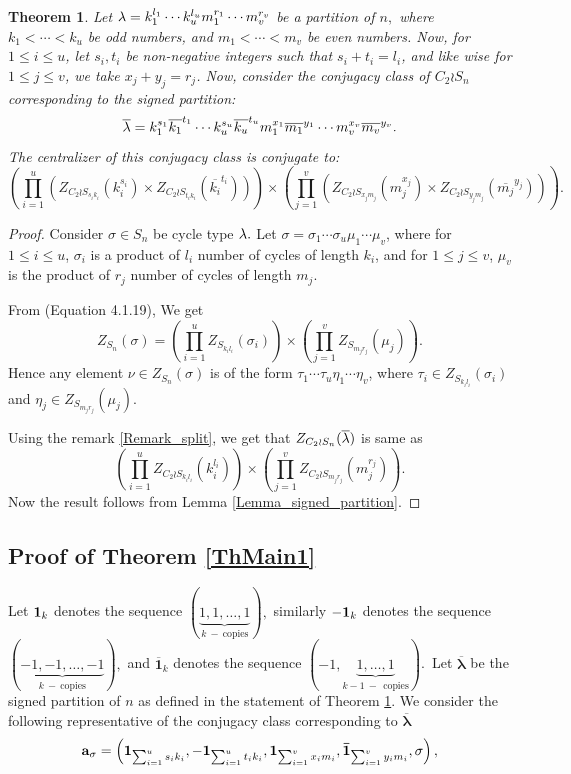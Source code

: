 \documentclass[12pt,twoside,reqno]{amsart}
\newtheorem{theorem}{Theorem}[section]
\theoremstyle{definition}
\numberwithin{equation}{section}
\newcommand{\bmf}[1]{\mathbf{#1}}
\newcommand{\Lbd}{\bm {\lambda}}
\begin{document}
\begin{theorem}\label{ThOddEven}
Let ${\bf \lambda} =k_1^{l_1}\cdots k_u^{l_u}m_1^{r_1}\cdots m_v^{r_v}$ be a partition of $n,$ where $k_1< \cdots < k_u$ be odd numbers, and $m_1<\cdots <m_v$ be even numbers. Now, for $1\leq i \leq u$, let $s_i, t_i$ be non-negative integers such that $s_i + t_i = l_i$, and like wise for $1\leq j \leq v$, we take $x_j+y_j = r_j$. Now, consider the conjugacy class of $C_2 \wr S_n$ corresponding to the signed partition: 
$${\bf \overline{\lambda}}=k_1^{s_1}\overline{k_1}^{t_1}\cdots k_u^{s_u}\overline{k_u}^{t_u}m_1^{x_1}\overline{m_1}^{y_1}\cdots m_v^{x_v}\overline{m_v}^{y_v}.$$
The centralizer of this conjugacy class is conjugate to:
$$\left(\prod_{i=1}^u (Z_{C_2 \wr {S_{s_ik_i}}}(k_i^{s_i})\times Z_{C_2 \wr{S_{t_ik_i}}}(\overline{k_i}^{t_i})) \right)\times \left(\prod_{j=1}^v (Z_{C_2 \wr{S_{x_jm_j}}}(m_j^{x_j})\times Z_{C_2 \wr {S_{y_jm_j}}}(\overline{m_j}^{y_j})) \right).$$
\end{theorem}
\begin{proof}
    Consider $\sigma\in S_n$  be cycle type ${\bf \lambda}.$ Let $\sigma = \sigma_1\cdots \sigma_u\mu_1\cdots\mu_v$, where for $1\leq i \leq u$, $\sigma_i$ is a product of $l_i$ number of cycles of length $k_i$, and for $1\leq j \leq v$, $\mu_v$ is the product of $r_j$ number of cycles of length $m_j.$ 

From \cite{JK}(Equation 4.1.19), We get 
$$Z_{S_n}(\sigma)= \left(\prod_{i=1}^u Z_{S_{k_il_i}}(\sigma_i)\right)\times \left(\prod_{j=1}^vZ_{S_{m_jr_j}}(\mu_j)\right).$$ Hence any element $\nu \in Z_{S_n}(\sigma)$ is of the form $\tau_1\cdots\tau_u\eta_1\cdots\eta_v$, where $\tau_i\in Z_{S_{k_il_i}}(\sigma_i)$ and $\eta_j \in Z_{S_{m_jr_j}}(\mu_j)$. 

Using the remark \ref{Remark_split}, we get that $Z_{C_2 \wr S_n}({\bf \overline{\lambda}})$ is same as 
$$\left(\prod_{i=1}^u Z_{C_2\wr S_{k_il_i}}(k_i^{l_i})\right)\times \left(\prod_{j=1}^v Z_{C_2 \wr S_{m_jr_j}}(m_j^{r_j})\right).$$ 
Now the result follows from Lemma \ref{Lemma_signed_partition}.

\end{proof}
\subsection{Proof of Theorem \ref{ThMain1}}
Let ${\bf 1}_k $ denotes the sequence $(\underbrace{1,1,\ldots,1}_{k~-~\mathrm{copies}}),$  similarly ${\bf -1}_k$ denotes the sequence$(\underbrace{-1,-1,\ldots,-1}_{k~-~\mathrm{copies}}),$ and 
$\overline{\bmf{1}}_k$ denotes the sequence $(-1,\underbrace{1, \ldots, 1}_{k-1~-~~\mathrm{copies}})$.\
Let $\overline{\Lbd}$ be the signed partition of $n$ as defined in the statement of Theorem \ref{ThOddEven}. We consider the following representative of the conjugacy class corresponding to $\overline{\Lbd}$
$${\bf a}_\sigma = \left( {\bf 1}_{\sum_{i=1}^u s_ik_i}, {\bf -1}_{\sum_{i=1}^u t_ik_i}, {\bf 1}_{\sum_{i=1}^v x_im_i},{\bf \bar{1}}_{\sum_{i=1}^v y_im_i}, \sigma \right),$$
\end{document}
